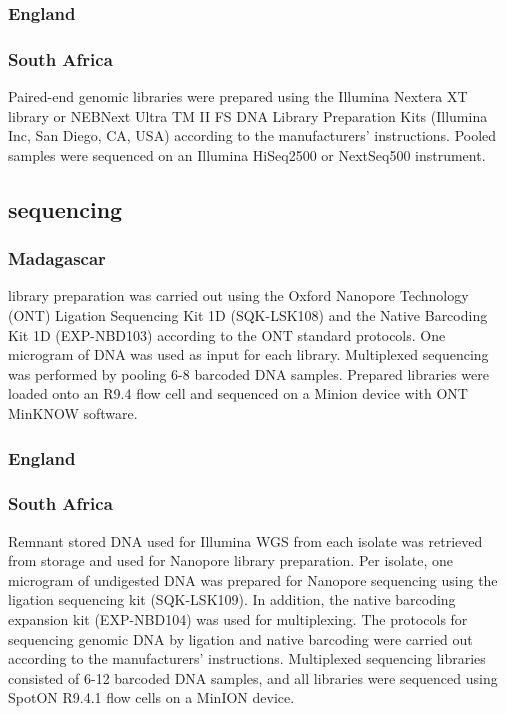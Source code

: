 \subsubsection{England}


\subsubsection{South Africa}
Paired-end genomic libraries were prepared using the Illumina Nextera XT library or NEBNext Ultra TM II FS DNA Library Preparation Kits (Illumina Inc, San Diego, CA, USA) according to the manufacturers’ instructions. Pooled samples were sequenced on an Illumina HiSeq2500 or NextSeq500 instrument.

\subsection{\ont{} sequencing}

\subsubsection{Madagascar}
\ont{} library preparation was carried out using the Oxford Nanopore Technology (ONT) Ligation Sequencing Kit 1D (SQK-LSK108) and the Native Barcoding Kit 1D (EXP-NBD103) according to the ONT standard protocols. One microgram of DNA was used as input for each library. Multiplexed sequencing was performed by pooling 6-8 barcoded DNA samples. Prepared libraries were loaded onto an R9.4 flow cell and sequenced on a Minion device with ONT MinKNOW software.

\subsubsection{England}


\subsubsection{South Africa}
Remnant stored DNA used for Illumina WGS from each isolate was retrieved from storage and used for Nanopore library preparation. Per isolate, one microgram of undigested DNA was prepared for Nanopore sequencing using the ligation sequencing kit (SQK-LSK109). In addition, the native barcoding expansion kit (EXP-NBD104) was used for multiplexing. The protocols for sequencing genomic DNA by ligation and native barcoding were carried out according to the manufacturers’ instructions. Multiplexed sequencing libraries consisted of 6-12 barcoded DNA samples, and all libraries were sequenced using SpotON R9.4.1 flow cells on a MinION device.

